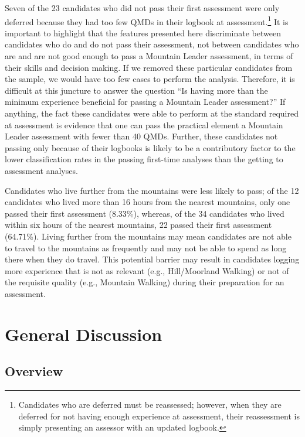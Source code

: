 \documentclass[
  12pt,
  a4paper,
]{book}
\begin{document}
Seven of the 23 candidates who did not pass their first assessment were only deferred because they had too few QMDs in their logbook at assessment.\footnote{Candidates who are deferred must be reassessed; however, when they are deferred for not having enough experience at assessment, their reassessment is simply presenting an assessor with an updated logbook.} It is important to highlight that the features presented here discriminate between candidates who do and do not pass their assessment, not between candidates who are and are not good enough to pass a Mountain Leader assessment, in terms of their skills and decision making. If we removed these particular candidates from the sample, we would have too few cases to perform the analysis. Therefore, it is difficult at this juncture to answer the question ``Is having more than the minimum experience beneficial for passing a Mountain Leader assessment?'' If anything, the fact these candidates were able to perform at the standard required at assessment is evidence that one can pass the practical element a Mountain Leader assessment with fewer than 40 QMDs. Further, these candidates not passing only because of their logbooks is likely to be a contributory factor to the lower classification rates in the passing first-time analyses than the getting to assessment analyses.

Candidates who live further from the mountains were less likely to pass; of the 12 candidates who lived more than 16 hours from the nearest mountains, only one passed their first assessment (8.33\%), whereas, of the 34 candidates who lived within six hours of the nearest mountains, 22 passed their first assessment (64.71\%). Living further from the mountains may mean candidates are not able to travel to the mountains as frequently and may not be able to spend as long there when they do travel. This potential barrier may result in candidates logging more experience that is not as relevant (e.g., Hill/Moorland Walking) or not of the requisite quality (e.g., Mountain Walking) during their preparation for an assessment.

\hypertarget{pra-gen-discussion}{%
\section{General Discussion}\label{pra-gen-discussion}}

\hypertarget{overview}{%
\subsection{Overview}\label{overview}}
\end{document}
